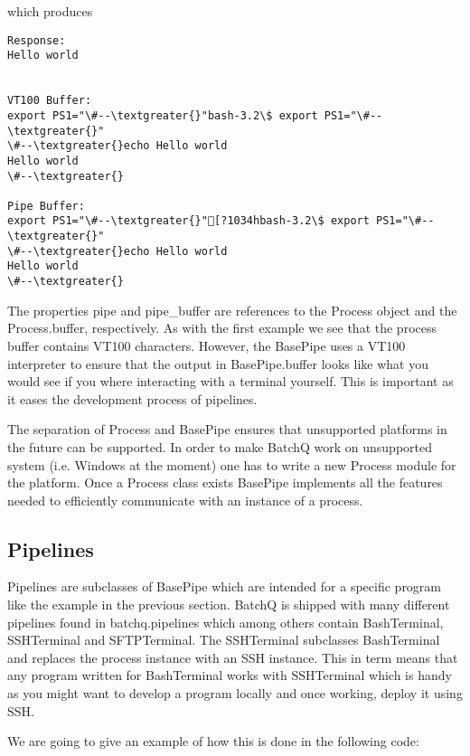 \documentclass[letterpaper,10pt,english]{sphinxmanual}
\begin{document}
which produces

\begin{Verbatim}[commandchars=\\\{\}]
Response: 
Hello world


VT100 Buffer:
export PS1="\#--\textgreater{}"bash-3.2\$ export PS1="\#--\textgreater{}"
\#--\textgreater{}echo Hello world
Hello world
\#--\textgreater{}

Pipe Buffer:
export PS1="\#--\textgreater{}"[?1034hbash-3.2\$ export PS1="\#--\textgreater{}"
\#--\textgreater{}echo Hello world
Hello world
\#--\textgreater{}
\end{Verbatim}

The properties pipe and pipe\_buffer are references to the Process object
and the Process.buffer, respectively. As with the first example we see
that the process buffer contains VT100 characters. However, the BasePipe
uses a VT100 interpreter to ensure that the output in BasePipe.buffer
looks like what you would see if you where interacting with a terminal
yourself. This is important as it eases the development process of
pipelines.

The separation of Process and BasePipe ensures that unsupported
platforms in the future can be supported. In order to make BatchQ work
on unsupported system (i.e. Windows at the moment) one has to write a
new Process module for the platform. Once a Process class exists
BasePipe implements all the features needed to efficiently communicate
with an instance of a process.


\subsection{Pipelines}
\label{tutorial:pipelines}
Pipelines are subclasses of BasePipe which are intended for a specific
program like the example in the previous section. BatchQ is shipped with
many different pipelines found in batchq.pipelines which among others
contain BashTerminal, SSHTerminal and SFTPTerminal. The SSHTerminal
subclasses BashTerminal and replaces the process instance with an SSH
instance. This in term means that any program written for BashTerminal
works with SSHTerminal which is handy as you might want to develop a
program locally and once working, deploy it using SSH.

We are going to give an example of how this is done in the following
code:
\end{document}
